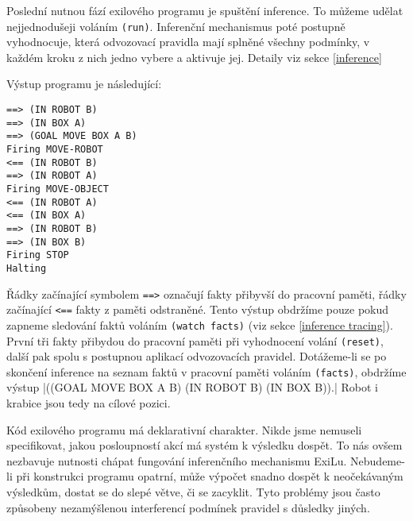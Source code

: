 Poslední nutnou fází exilového programu je spuštění inference. To můžeme udělat
nejjednodušeji voláním \verb|(run)|. Inferenční mechanismus poté postupně
vyhodnocuje, která odvozovací pravidla mají splněné všechny podmínky, v každém
kroku z nich jedno vybere a aktivuje jej. Detaily viz sekce \ref{inference}

Výstup programu je následující:
\begin{verbatim}
==> (IN ROBOT B)
==> (IN BOX A)
==> (GOAL MOVE BOX A B)
Firing MOVE-ROBOT
<== (IN ROBOT B)
==> (IN ROBOT A)
Firing MOVE-OBJECT
<== (IN ROBOT A)
<== (IN BOX A)
==> (IN ROBOT B)
==> (IN BOX B)
Firing STOP
Halting
\end{verbatim}
Řádky začínající symbolem \verb|==>| označují fakty přibyvší do pracovní paměti,
řádky začínající \verb|<==| fakty z paměti odstraněné. Tento výstup obdržíme
pouze pokud zapneme sledování faktů voláním \verb|(watch facts)| (viz sekce
\ref{inference tracing}). První tři fakty přibydou do pracovní paměti při
vyhodnocení volání \verb|(reset)|, další pak spolu s postupnou aplikací
odvozovacích pravidel. Dotážeme-li se po skončení inference na seznam faktů v
pracovní paměti voláním \verb|(facts)|, obdržíme výstup
\cl|((GOAL MOVE BOX A B) (IN ROBOT B) (IN BOX B)).|
Robot i krabice jsou tedy na cílové pozici.

Kód exilového programu má deklarativní charakter. Nikde jsme nemuseli
specifikovat, jakou posloupností akcí má systém k výsledku dospět. To nás ovšem
nezbavuje nutnosti chápat fungování inferenčního mechanismu ExiLu. Nebudeme-li
při konstrukci programu opatrní, může výpočet snadno dospět k neočekávaným
výsledkům, dostat se do slepé větve, či se zacyklit. Tyto problémy jsou často
způsobeny nezamýšlenou interferencí podmínek pravidel s důsledky jiných.

\FloatBarrier
